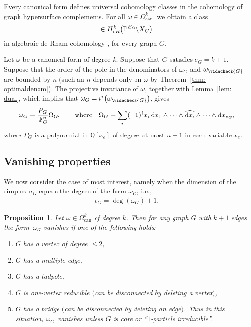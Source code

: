 \documentclass[pdftex]{sigma}%
\newtheorem{prop}[thm]{Proposition}
\numberwithin{equation}{section}
\newcommand{\Q}{\mathbb Q}
\newcommand{\Pro}{\mathbb P}
\newcommand{\can}{\mathrm{can}}
\newcommand{\0}{\color{blue}{\mathsf{0}}}
\begin{document}
\begin{defn} Every canonical form defines universal cohomology classes in the cohomology of graph hypersurface complements. For all $\omega \in \Omega^{k}_{\can}$, we obtain a class
\begin{gather*}
[\omega_G] \in H_{{\rm d}R}^k \big(\Pro^{E_G} \backslash X_G\big)
\end{gather*}
in algebraic de Rham cohomology \cite{Grothendieck}, for every graph $G$.
\end{defn}

 \begin{rem} \label{rem: degreexe}
 Let $\omega$ be a canonical form of degree $k$. Suppose that $G$ satisfies $e_G = k+1$.
 Suppose that the order of the pole in the denominators of $\omega_G$ and $\omega_{\widecheck{G}}$ are bounded by $n$ (such an $n$ depends only on $\omega$ by Theorem~\ref{thm: optimaldenom}). The projective invariance of $\omega$, together with Lemma~\ref{lem: dual}, which implies that $\omega_G =i^*\big(\omega_{\widecheck{G}}\big)$, gives
 \begin{gather*}
 \omega_G = \frac{P_G}{\Psi_G^{n}} \Omega_G, \qquad \text{where} \quad \Omega_G= \sum_{i} (-1)^i x_i \,{\rm d}x_1 \wedge \cdots \wedge\widehat{{\rm d}x_i} \wedge \cdots \wedge {\rm d}x_{e_G},
 \end{gather*}
 where $P_G$ is a polynomial in $\Q[x_e]$ of degree at most $n-1$ in each variable $x_e$.
 \end{rem}

\subsection{Vanishing properties}
We now consider the case of most interest, namely when the dimension of the simplex $\sigma_G$ equals the degree of the form $\omega_G$, i.e.,
\begin{gather*}
e_G = \deg (\omega_G)+1 .
\end{gather*}

\begin{prop} \label{prop: vanishing} \samepage Let $\omega \in \Omega_{\can}^{k}$ of degree $k$. Then for any graph $G$ with $k+1$ edges the form~$\omega_G$ vanishes
 if one of the following holds:
\begin{enumerate}\itemsep=0pt
\item[$(i)$] $G$ has a vertex of degree $\leq 2$,

\item[$(ii)$] $G$ has a multiple edge,

\item[$(iii)$] $G$ has a tadpole,

\item[$(iv)$] $G$ is one-vertex reducible $($can be disconnected by deleting a vertex$)$,

\item[$(v)$] $G$ has a bridge $($can be disconnected by deleting an edge$)$. Thus in this situation, $\omega_G$~va\-nishes unless $G$ is core or ``$1$-particle irreducible''.
\end{enumerate}
\end{prop}
\end{document}
